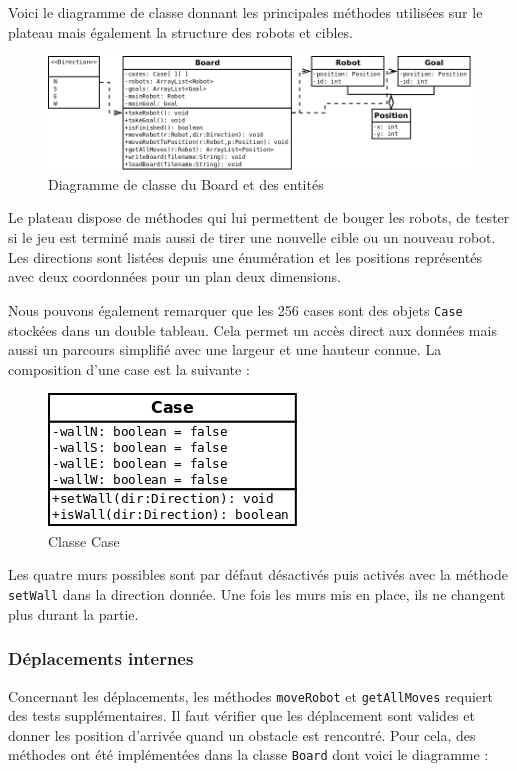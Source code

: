 \documentclass[a4paper]{article} %
\begin{document}
Voici le diagramme de classe donnant les principales méthodes utilisées sur le plateau mais également la structure des robots et cibles.

\begin{figure}[!h]
	\begin{center}
	\includegraphics[scale=0.5]{./images/boardwithentities.png}
	\caption{Diagramme de classe du Board et des entités}
	\end{center}
\end{figure}

Le plateau dispose de méthodes qui lui permettent de bouger les robots, de tester si le jeu est terminé mais aussi de tirer une nouvelle cible ou un nouveau robot. Les directions sont listées depuis une énumération et les positions représentés avec deux coordonnées pour un plan deux dimensions.

Nous pouvons également remarquer que les 256 cases sont des objets \texttt{Case} stockées dans un double tableau. Cela permet un accès direct aux données mais aussi un parcours simplifié avec une largeur et une hauteur connue. La composition d'une case est la suivante :
\begin{figure}[htpb]
	\begin{center}
	\includegraphics[scale=0.5]{./images/casediag.png}
	\caption{Classe Case}
	\end{center}
\end{figure}

Les quatre murs possibles sont par défaut désactivés puis activés avec la méthode \texttt{setWall} dans la direction donnée. Une fois les murs mis en place, ils ne changent plus durant la partie.

		\subsubsection{Déplacements internes}
Concernant les déplacements, les méthodes \texttt{moveRobot} et \texttt{getAllMoves} requiert des tests supplémentaires. Il faut vérifier que les déplacement sont valides et donner les position d'arrivée quand un obstacle est rencontré. Pour cela, des méthodes ont été implémentées dans la classe \texttt{Board} dont voici le diagramme :
\end{document}
